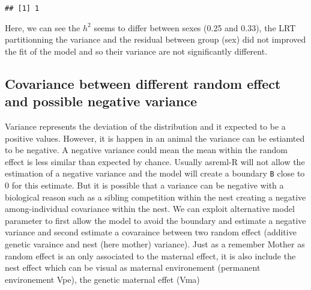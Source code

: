 \documentclass[
  12pt,
]{book}
\begin{document}
\begin{verbatim}
## [1] 1
\end{verbatim}

Here, we can see the \(h^2\) seems to differ between sexes (0.25 and 0.33), the LRT partitionning the variance and the residual between group (sex) did not improved the fit of the model and so their variance are not significantly different.

\hypertarget{covariance-between-different-random-effect-and-possible-negative-variance}{%
\subsection{Covariance between different random effect and possible negative variance}\label{covariance-between-different-random-effect-and-possible-negative-variance}}

Variance represents the deviation of the distribution and it expected to be a positive values. However, it is happen in an animal the variance can be estiamted to be negative.
A negative variance could mean the mean within the random effect is less similar than expected by chance. Usually asreml-R will not allow the estimation of a negative variance and the model will create a boundary \texttt{B} close to 0 for this estimate.
But it is possible that a variance can be negative with a biological reason such as a sibling competition within the nest creating a negative among-individual covariance within the nest. We can exploit alternative model parameter to first allow the model to avoid the boundary and estimate a negative variance and second estimate a covaraince between two random effect (additive genetic varaince and nest (here mother) variance).
Just as a remember Mother as random effect is an only associated to the maternal effect, it is also include the nest effect which can be visual as maternal environement (permanent environement Vpe), the genetic maternal effet (Vma)
\end{document}
